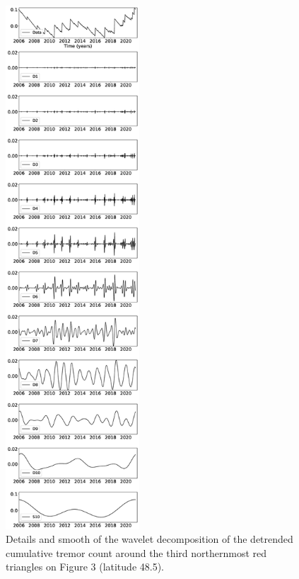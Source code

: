 \documentclass{article}
\begin{document}
\begin{figure}
\noindent\includegraphics[width=5cm, trim={0cm 0cm 0cm 0cm},clip]{figures/tremor_13.eps}
\caption{Details and smooth of the wavelet decomposition of the detrended cumulative tremor count around the third northernmost red triangles on Figure 3 (latitude 48.5).}
\label{pngfiguresample}
\end{figure}
\end{document}
